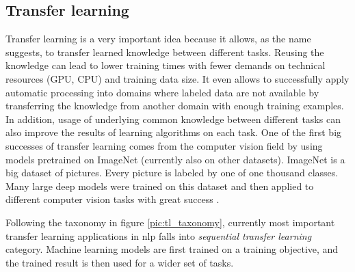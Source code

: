 \subsection{Transfer learning}
\label{sub:models}
Transfer learning is a very important idea because it allows, as the name suggests, to transfer learned knowledge between different tasks. 
Reusing the knowledge can lead to lower training times with fewer demands on technical resources (GPU, CPU) and training data size. It even allows to successfully apply automatic processing into domains where labeled data are not available by transferring the knowledge from another domain with enough training examples. In addition, usage of underlying common knowledge between different tasks can also improve the results of learning algorithms on each task. %
One of the first big successes of transfer learning comes from the computer vision field by using models pretrained on ImageNet (currently also on other datasets). ImageNet \citep{Russakovsky2015} is a big dataset of pictures. Every picture is labeled by one of one thousand classes. Many large deep models were trained on this dataset and then applied to different computer vision tasks with great success \citep{Huh}.  %
\par
Following the taxonomy in figure \ref{pic:tl_taxonomy}, currently most important transfer learning applications in \acrshort{nlp} falls into \textit{sequential transfer learning} category. Machine learning models are first trained on a training objective, and the trained result is then used for a wider set of tasks.
